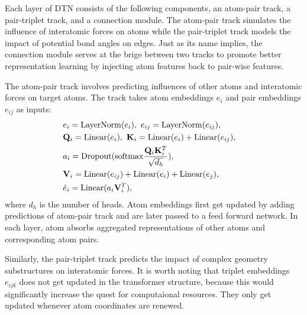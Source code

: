\documentclass[letterpaper]{article} %
\begin{document}
Each layer of DTN consists of the following components, an atom-pair track, a pair-triplet track, and a connection module. The atom-pair track simulates the influence of interatomic forces on atoms while the pair-triplet track models the impact of potential bond angles on edges. Just as its name implies, the connection module serves at the brige between two tracks to promote better representation learning by injecting atom features back to pair-wise features.

The atom-pair track involves predicting influences of other atoms and interatomic forces on target atoms. The track takes atom embeddings $e_i$ and pair embeddings $e_{ij}$ as inputs: 
\begin{eqnarray}
    &e_i = {\rm LayerNorm}(e_i), \ e_{ij} = {\rm LayerNorm}(e_{ij}),& \\
    &\mathbf{Q}_i = {\rm Linear}(e_i), \ \mathbf{K}_i = {\rm Linear}(e_i) + {\rm Linear}(e_{ij}),& \\
    &a_i = {\rm Dropout}({\rm softmax} \frac{\mathbf{Q}_i \mathbf{K}_i^T}{\sqrt{d_h}}), & \\
    &\mathbf{V}_i = {\rm Linear}(e_{ij}) + {\rm Linear}(e_{i}) + {\rm Linear}(e_{j}),& \\
    &\hat{e}_i = {\rm Linear}(a_i \mathbf{V}_i^T),&
\end{eqnarray}
where $d_h$ is the number of heads. Atom embeddings first get updated by adding predictions of atom-pair track and are later passed to a feed forward network. In each layer, atom absorbs aggregated representations of other atoms and corresponding atom pairs.

Similarly, the pair-triplet track predicts the impact of complex geometry substructures on interatomic forces.
It is worth noting that triplet embeddings $e_{ijk}$ does not get updated in the transformer structure, because this would significantly increase the quest for computaional resources. They only get updated whenever atom coordinates are renewed.
\end{document}
